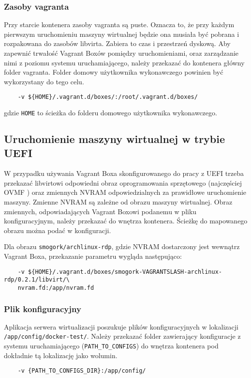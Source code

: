 \documentclass[../opis-rozwiazania.tex]{subfiles}
\begin{document}
\subsubsection{Zasoby vagranta}
Przy starcie kontenera zasoby vagranta są puste.
Oznacza to, że przy każdym pierwszym uruchomieniu maszyny wirtualnej będzie ona musiała być pobrana i rozpakowana do zasobów libvirta.
Zabiera to czas i przestrzeń dyskową.
Aby zapewnić trwałość Vagrant Boxów pomiędzy uruchomieniami, oraz zarządzanie nimi z poziomu systemu uruchamiającego, należy przekazać do kontenera główny folder vagranta.
Folder domowy użytkownika wykonawczego powinien być wykorzystany do tego celu.

\begin{verbatim}
	-v ${HOME}/.vagrant.d/boxes/:/root/.vagrant.d/boxes/
\end{verbatim}
gdzie \texttt{HOME} to ścieżka do folderu domowego użytkownika wykonawczego.

\subsection{Uruchomienie maszyny wirtualnej w trybie UEFI}

W przypadku używania Vagrant Boxa skonfigurowanego do pracy z UEFI trzeba przekazać libvirtowi odpowiedni obraz oprogramowania sprzętowego (najczęściej OVMF \parencite{ovmf}) oraz zmiennych NVRAM odpowiedzialnych za prawidłowe uruchomienie maszyny.
Zmienne NVRAM są zależne od obrazu maszyny wirtualnej.
Obraz zmiennych, odpowiadających Vagrant Boxowi podanemu w pliku konfiguracyjnym, należy przekazać do wnętrza kontenera.
Ścieżkę do mapowanego obrazu można podać w konfiguracji.

Dla obrazu \texttt{smogork/archlinux-rdp}, gdzie NVRAM dostarczony jest wewnątrz Vagrant Boxa, przekazanie parametru wygląda następująco:
\begin{verbatim}
	-v ${HOME}/.vagrant.d/boxes/smogork-VAGRANTSLASH-archlinux-rdp/0.2.1/libvirt/\
	nvram.fd:/app/nvram.fd
\end{verbatim}

\subsubsection{Plik konfiguracyjny}
Aplikacja serwera wirtualizacji poszukuje plików konfiguracyjnych w lokalizacji \texttt{/app/config/docker-test/}.
Należy przekazać folder zawierający konfiguracje z systemu uruchamiającego (\texttt{PATH\_TO\_CONFIGS}) do wnętrza kontenera pod dokładnie tą lokalizację jako wolumin.
\begin{verbatim}
	-v {PATH_TO_CONFIGS_DIR}:/app/config/
\end{verbatim}
\end{document}
